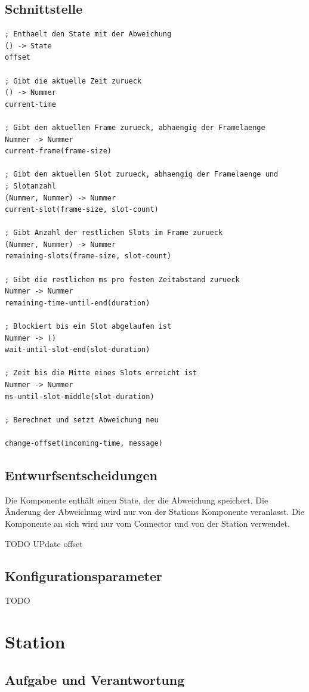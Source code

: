 \documentclass[draft=false
              ,paper=a4
              ,twoside=false
              ,fontsize=11pt
              ,headsepline
              ,BCOR10mm
              ,DIV11
              ]{scrbook}
\begin{document}
\subsection{Schnittstelle}
\begin{lstlisting}
; Enthaelt den State mit der Abweichung
() -> State
offset

; Gibt die aktuelle Zeit zurueck
() -> Nummer
current-time

; Gibt den aktuellen Frame zurueck, abhaengig der Framelaenge
Nummer -> Nummer
current-frame(frame-size)

; Gibt den aktuellen Slot zurueck, abhaengig der Framelaenge und
; Slotanzahl
(Nummer, Nummer) -> Nummer
current-slot(frame-size, slot-count)

; Gibt Anzahl der restlichen Slots im Frame zurueck
(Nummer, Nummer) -> Nummer
remaining-slots(frame-size, slot-count)

; Gibt die restlichen ms pro festen Zeitabstand zurueck
Nummer -> Nummer
remaining-time-until-end(duration)

; Blockiert bis ein Slot abgelaufen ist
Nummer -> ()
wait-until-slot-end(slot-duration)

; Zeit bis die Mitte eines Slots erreicht ist
Nummer -> Nummer
ms-until-slot-middle(slot-duration)

; Berechnet und setzt Abweichung neu

change-offset(incoming-time, message)
\end{lstlisting}

\subsection{Entwurfsentscheidungen}
Die Komponente enthält einen State, der die Abweichung speichert. Die Änderung der Abweichung wird nur von der Stations Komponente veranlasst. Die Komponente an sich wird nur vom Connector und von der Station verwendet.

TODO UPdate offset

\subsection{Konfigurationsparameter}
TODO

\section{Station}
\subsection{Aufgabe und Verantwortung}
\end{document}
